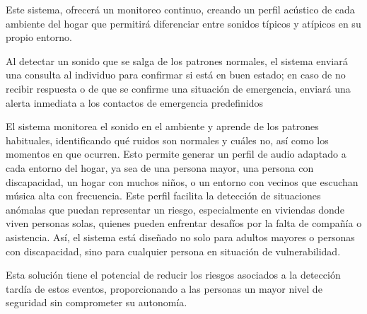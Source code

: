 Este sistema, ofrecerá un monitoreo continuo, creando un perfil acústico de cada ambiente del hogar que permitirá diferenciar entre sonidos típicos y atípicos en su propio entorno.

Al detectar un sonido que se salga de los patrones normales, el sistema enviará una consulta al individuo para confirmar si está en buen estado; en caso de no recibir respuesta o de que se confirme una situación de emergencia, enviará una alerta inmediata a los contactos de emergencia predefinidos

El sistema monitorea el sonido en el ambiente y aprende de los patrones habituales, identificando qué ruidos son normales y cuáles no, así como los momentos en que ocurren. Esto permite generar un perfil de audio adaptado a cada entorno del hogar, ya sea de una persona mayor, una persona con discapacidad, un hogar con muchos niños, o un entorno con vecinos que escuchan música alta con frecuencia. Este perfil facilita la detección de situaciones anómalas que puedan representar un riesgo, especialmente en viviendas donde viven personas solas, quienes pueden enfrentar desafíos por la falta de compañía o asistencia. Así, el sistema está diseñado no solo para adultos mayores o personas con discapacidad, sino para cualquier persona en situación de vulnerabilidad.

Esta solución tiene el potencial de reducir los riesgos asociados a la detección tardía de estos eventos, proporcionando a las personas un mayor nivel de seguridad sin comprometer su autonomía.

